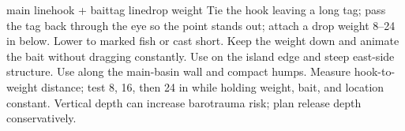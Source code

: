 
{{main line}{hook + bait}{tag line}{drop weight}}
{Tie the hook leaving a long tag; pass the tag back through the eye so the
point stands out; attach a drop weight 8--24 in below.}
{Lower to marked fish or cast short. Keep the weight down and animate the bait
without dragging constantly.}
{Use on the island edge and steep east-side structure.}
{Use along the main-basin wall and compact humps.}
{Measure hook-to-weight distance; test 8, 16, then 24 in while holding weight,
bait, and location constant.}
{Vertical depth can increase barotrauma risk; plan release depth conservatively.}
